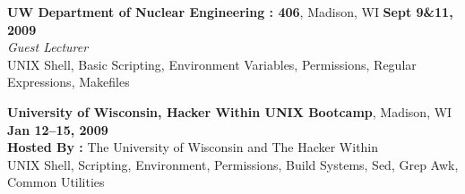 \documentclass[margin,line]{resume}
\begin{document}
\begin{resume}
    \textbf{UW Department of Nuclear Engineering : 406}, Madison, WI \hfill \textbf{Sept 9\&11, 2009}\\ 
               \textsl{Guest Lecturer}\\
               UNIX Shell, Basic Scripting, Environment Variables, Permissions, Regular Expressions, Makefiles 

    \pagebreak
    \textbf{University of Wisconsin, Hacker Within UNIX Bootcamp}, Madison, WI \hfill \textbf{Jan 12--15, 2009}\\
               \textbf{Hosted By : } The University of Wisconsin and The Hacker Within\\
               UNIX Shell, Scripting, Environment, Permissions, Build Systems, Sed, Grep Awk, Common Utilities

\end{resume}
\end{document}
